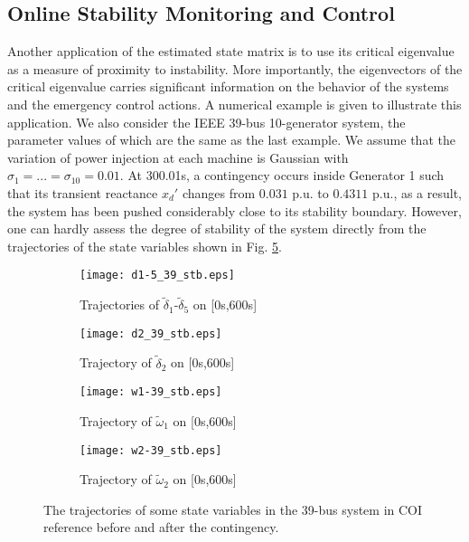 \documentclass[journal]{IEEEtran}
\begin{document}
\subsection{Online Stability Monitoring and Control}
Another application of the estimated state matrix is to use its critical eigenvalue as a measure of proximity to instability. More importantly, the eigenvectors of the critical eigenvalue carries significant information on the behavior of the systems and the emergency control actions. A numerical example is given to illustrate this application.
We also consider the IEEE 39-bus 10-generator system, the parameter values of which are the same as the last example. We assume that the variation of power injection at each machine is Gaussian with $\sigma_1=...=\sigma_{10}=0.01$.  At 300.01s, a contingency occurs inside Generator 1 such that its transient reactance $x_d'$ changes from $0.031$ p.u. to $0.4311$ p.u., as a result, the system has been pushed considerably close to its stability boundary. However, one can hardly  assess the degree of stability of the system directly from the trajectories of the state variables shown in Fig. \ref{39-bus-stability}.

\begin{figure}[!ht]
\centering
\begin{subfigure}[t]{0.52\linewidth}
\texttt{[image: d1-5\_39\_stb.eps]}
\caption{Trajectories of $\tilde{\delta}_{1}$-$\tilde{\delta}_{5}$ on [0s,600s]}\label{d1-5-39}
\end{subfigure}\begin{subfigure}[t]{0.5\linewidth}
\texttt{[image: d2\_39\_stb.eps]}
\caption{Trajectory of $\tilde{\delta}_{2}$ on [0s,600s]}\label{d2-39-stb}
\end{subfigure}
\begin{subfigure}[t]{0.48\linewidth}
\texttt{[image: w1-39\_stb.eps]}
\caption{Trajectory of $\tilde{\omega}_{1}$ on [0s,600s]}\label{w1-39-stb}
\end{subfigure}\begin{subfigure}[t]{0.5\linewidth}
\texttt{[image: w2-39\_stb.eps]}
\caption{Trajectory of $\tilde{\omega}_{2}$ on [0s,600s]}\label{w2-39-stb}
\end{subfigure}
\caption{The trajectories of some state variables in the 39-bus system in COI reference before and after the contingency.}\label{39-bus-stability}
\end{figure}
\end{document}
